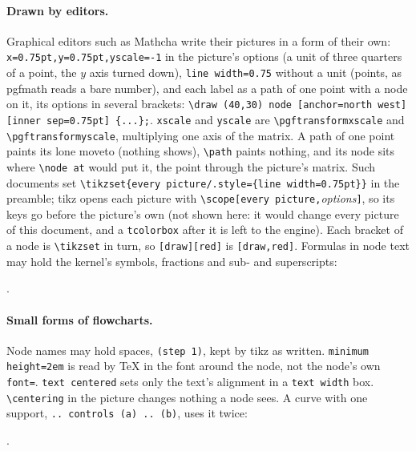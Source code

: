 \documentclass{article}
\numberwithin{equation}{section}
\theoremstyle{definition}
\theoremstyle{remark}
\begin{document}
\paragraph{Drawn by editors.} Graphical editors such as Mathcha write their pictures in a
form of their own: \verb|x=0.75pt,y=0.75pt,yscale=-1| in the picture's options (a unit of
three quarters of a point, the $y$ axis turned down), \verb|line width=0.75| without a unit
(points, as pgfmath reads a bare number), and each label as a path of one point with a node
on it, its options in several brackets: \verb|\draw (40,30) node [anchor=north west][inner sep=0.75pt] {...};|.
\verb|xscale| and \verb|yscale| are \verb|\pgftransformxscale| and
\verb|\pgftransformyscale|, multiplying one axis of the matrix. A path of one point paints
its lone moveto (nothing shows), \verb|\path| paints nothing, and its node sits where
\verb|\node at| would put it, the point through the picture's matrix. Such documents set
\verb|\tikzset{every picture/.style={line width=0.75pt}}| in the preamble; tikz opens each
picture with \verb|\scope[every picture,|\textit{options}\verb|]|, so its keys go before the
picture's own (not shown here: it would change every picture of this document, and a
\texttt{tcolorbox} after it is left to the engine). Each bracket of a
node is \verb|\tikzset| in turn, so \verb|[draw][red]| is \verb|[draw,red]|. Formulas in
node text may hold the kernel's symbols, fractions and sub- and superscripts:
.

\paragraph{Small forms of flowcharts.} Node names may hold spaces, \verb|(step 1)|, kept
by tikz as written. \verb|minimum height=2em| is read by \TeX{} in the font around the
node, not the node's own \verb|font=|. \verb|text centered| sets only the text's
alignment in a \verb|text width| box. \verb|\centering| in the picture changes nothing a
node sees. A curve with one support, \verb|.. controls (a) .. (b)|, uses it twice:
.
\end{document}
